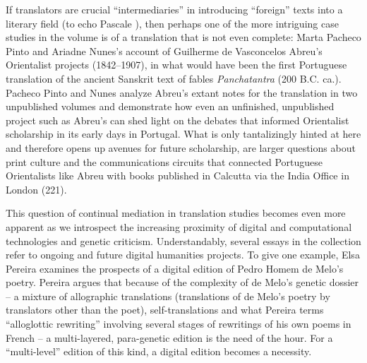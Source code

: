 \documentclass{article}
\begin{document}
If translators are crucial ``intermediaries'' in introducing ``foreign''
texts into a literary field (to echo Pascale \citeauthor{casanova_world_2004}), then perhaps one
of the more intriguing case studies in the volume is of a translation
that is not even complete: Marta Pacheco Pinto and Ariadne Nunes's
account of Guilherme de Vasconcelos Abreu's Orientalist projects
(1842--1907), in what would have been the first Portuguese translation
of the ancient Sanskrit text of fables \emph{Panchatantra} (200 B.C.
ca.). Pacheco Pinto and Nunes analyze Abreu's extant notes for the
translation in two unpublished volumes and demonstrate how even an
unfinished, unpublished project such as Abreu's can shed light on the
debates that informed Orientalist scholarship in its early days in
Portugal. What is only tantalizingly hinted at here and therefore opens
up avenues for future scholarship, are larger questions about print
culture and the communications circuits that connected Portuguese
Orientalists like Abreu with books published in Calcutta via the India
Office in London (221).

This question of continual mediation in translation studies becomes even
more apparent as we introspect the increasing proximity of digital and
computational technologies and genetic criticism. Understandably,
several essays in the collection refer to ongoing and future digital
humanities projects. To give one example, Elsa Pereira examines the
prospects of a digital edition of Pedro Homem de Melo's poetry. Pereira
argues that because of the complexity of de Melo's genetic dossier -- a
mixture of allographic translations (translations of de Melo's poetry by
translators other than the poet), self-translations and what Pereira
terms ``alloglottic rewriting'' involving several stages of rewritings
of his own poems in French -- a multi-layered, para-genetic edition is
the need of the hour. For a ``multi-level'' edition of this kind, a
digital edition becomes a necessity.
\end{document}
